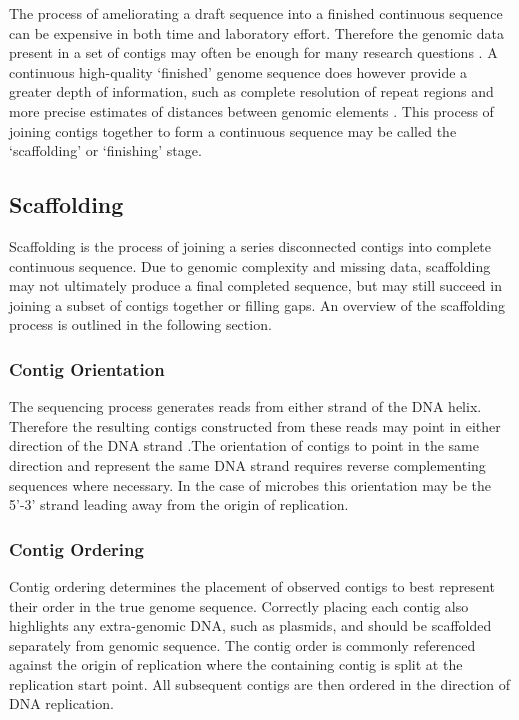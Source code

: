 \documentclass[10pt]{bmc_article}
\newenvironment{bmcformat}{\begin{raggedright}\baselineskip20pt\sloppy\setboolean{publ}{false}}{\end{raggedright}\baselineskip20pt\sloppy}
\begin{document}
\begin{bmcformat}
The process of ameliorating a draft sequence into a finished continuous
sequence can be expensive in both time and laboratory effort. Therefore the
genomic data present in a set of contigs may often be enough for many research
questions \cite{branscomb2002}. A continuous high-quality `finished' genome
sequence does however provide a greater depth of information, such as complete
resolution of repeat regions and more precise estimates of distances between
genomic elements \cite{parkhill2002,fraser2002}. This process of joining
contigs together to form a continuous sequence may be called the `scaffolding'
or `finishing' stage. \pb

\subsection*{Scaffolding} %

Scaffolding is the process of joining a series disconnected contigs into
complete continuous sequence. Due to genomic complexity and missing data,
scaffolding may not ultimately produce a final completed sequence, but may
still succeed in joining a subset of contigs together or filling gaps. An
overview of the scaffolding process is outlined in the following section.

\subsubsection*{Contig Orientation} %

The sequencing process generates reads from either strand of the DNA helix.
Therefore the resulting contigs constructed from these reads may point in
either direction of the DNA strand .The orientation of contigs to point in the
same direction and represent the same DNA strand requires reverse complementing
sequences where necessary. In the case of microbes this orientation may be the
5'-3' strand leading away from the origin of replication.

\subsubsection*{Contig Ordering} %

Contig ordering determines the placement of observed contigs to best represent
their order in the true genome sequence. Correctly placing each contig also
highlights any extra-genomic DNA, such as plasmids, and should be scaffolded
separately from genomic sequence. The contig order is commonly referenced
against the origin of replication where the containing contig is split at the
replication start point. All subsequent contigs are then ordered in the
direction of DNA replication.


\end{bmcformat}
\end{document}
